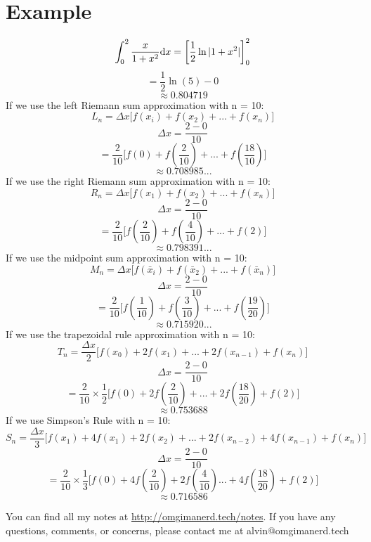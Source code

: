 \documentclass[letterpaper, 12pt]{math}
\begin{document}
\section*{Example}
\[ \int_{0}^{2}{\frac{x}{1+x^{2}}\mathrm{d}{x}} =
   \bigg[\frac{1}{2}\ln|1+x^{2}|\bigg]_{0}^{2} \]
\[ = \frac{1}{2}\ln(5)-0 \]
\[ \approx 0.804719 \]
If we use the left Riemann sum approximation with n = 10:
\[ L_{n} = \Delta x\bigg[f(x_{i})+f(x_{2})+...+f(x_{n})\bigg] \]
\[ \Delta x = \frac{2-0}{10} \]
\[ = \frac{2}{10}\bigg[f(0)+f(\frac{2}{10})+...+f(\frac{18}{10})\bigg] \]
\[ \approx 0.708985... \]
If we use the right Riemann sum approximation with n = 10:
\[ R_{n} = \Delta x\bigg[f(x_{1})+f(x_{2})+...+f(x_{n})\bigg] \]
\[ \Delta x = \frac{2-0}{10} \]
\[ = \frac{2}{10}\bigg[f(\frac{2}{10})+f(\frac{4}{10})+...+f(2)\bigg] \]
\[ \approx 0.798391... \]
If we use the midpoint sum approximation with n = 10:
\[ M_{n} = \Delta x\bigg[
   f(\bar{x}_{i})+f(\bar{x}_{2})+...+f(\bar{x}_{n})\bigg] \]
\[ \Delta x = \frac{2-0}{10} \]
\[ = \frac{2}{10}\bigg[
   f(\frac{1}{10})+f(\frac{3}{10})+...+f(\frac{19}{20})\bigg] \]
\[ \approx 0.715920... \]
If we use the trapezoidal rule approximation with n = 10:
\[ T_{n} = \frac{\Delta x}{2}\bigg[
   f(x_{0})+2f(x_{1})+...+2f(x_{n-1})+f(x_{n})\bigg] \]
\[ \Delta x = \frac{2-0}{10} \]
\[ = \frac{2}{10}\times\frac{1}{2}\bigg[
   f(0)+2f(\frac{2}{10})+...+2f(\frac{18}{20})+f(2)\bigg] \]
\[ \approx 0.753688 \]
If we use Simpson's Rule with n = 10:
\[ S_{n} = \frac{\Delta x}{3}\bigg[
   f(x_{1})+4f(x_{1})+2f(x_{2})+...+2f(x_{n-2})+4f(x_{n-1})+f(x_{n})\bigg] \]
\[ \Delta x = \frac{2-0}{10} \]
\[ = \frac{2}{10}\times\frac{1}{3}\bigg[
   f(0)+4f(\frac{2}{10})+2f(\frac{4}{10})...+4f(\frac{18}{20})+f(2)\bigg] \]
\[ \approx 0.716586 \]

\begin{center}
  You can find all my notes at \url{http://omgimanerd.tech/notes}. If you have
  any questions, comments, or concerns, please contact me at
  alvin@omgimanerd.tech
\end{center}
\end{document}
